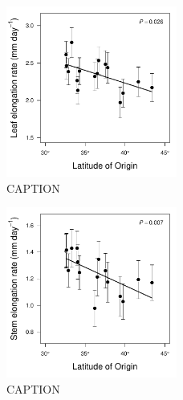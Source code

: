 \documentclass[11pt, oneside]{article}\usepackage[]{graphicx}\usepackage[]{color}
\begin{document}
\begin{figure}[h!]
	\centerline{\includegraphics[width=0.5\textwidth]{Figures/Figure_LLL_Lat.pdf}}
	\fontsize{10}{12}
	\selectfont
	\caption[Southern populations grow faster (leaf expansion rate).]{CAPTION}
	\label{fig:Fig_LLL}
\end{figure}

\begin{figure}
	\centerline{\includegraphics[width=0.5\textwidth]{Figures/Figure_Height_Lat.pdf}}
	\fontsize{10}{12}
	\selectfont
	\caption[Southern populations grow faster (stem elongation rate).]{CAPTION}
	\label{fig:Fig_height}
\end{figure}
\end{document}
